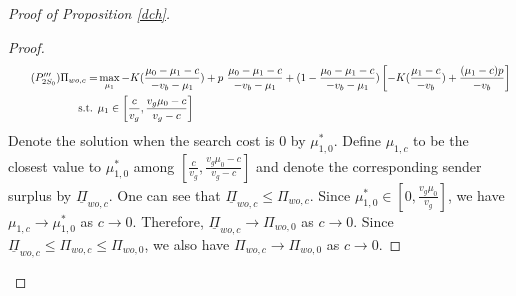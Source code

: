 \documentclass[11pt]{extarticle}
\begin{document}
\begin{proof}[Proof of Proposition \ref{dch}]
\begin{proof}
		\begin{align*}\tag{$P'''_{2S_0}$}
		\Pi_{wo,c} =& \max\limits_{\mu_1} -K(\frac{\mu_0-\mu_1-c}{-v_b-\mu_1}) + p~ \frac{\mu_0-\mu_1-c}{-v_b-\mu_1} + (1-\frac{\mu_0-\mu_1-c}{-v_b-\mu_1}) \left[-K(\frac{\mu_1-c}{-v_b})+\frac{(\mu_1-c)p}{-v_b}\right] \\
		\text{s.t. } &\mu_1\in \left[\frac{c}{v_g}, \frac{v_g\mu_0-c}{v_g-c} \right] 
		\end{align*}
		Denote the solution when the search cost is 0 by $\mu_{1,0}^*$. Define $\mu_{1,c}$ to be the closest value to $\mu_{1,0}^*$ among $\left[\frac{c}{v_g}, \frac{v_g\mu_0-c}{v_g-c} \right]$ and denote the corresponding sender surplus by $\underline{\Pi}_{wo,c}$. One can see that $\underline{\Pi}_{wo,c} \leq \Pi_{wo,c}$. Since $\mu_{1,0}^* \in \left[0, \frac{v_g\mu_0}{v_g} \right]$, we have $\mu_{1,c} \rightarrow \mu_{1,0}^*$ as $c \rightarrow 0$. Therefore, $\underline{\Pi}_{wo,c} \rightarrow \Pi_{wo,0}$ as $c \rightarrow 0$. Since $\underline{\Pi}_{wo,c} \leq \Pi_{wo,c} \leq \Pi_{wo,0}$, we also have $\Pi_{wo,c} \rightarrow \Pi_{wo,0}$ as $c \rightarrow 0$.
	\end{proof}	
\end{proof}
\end{document}
